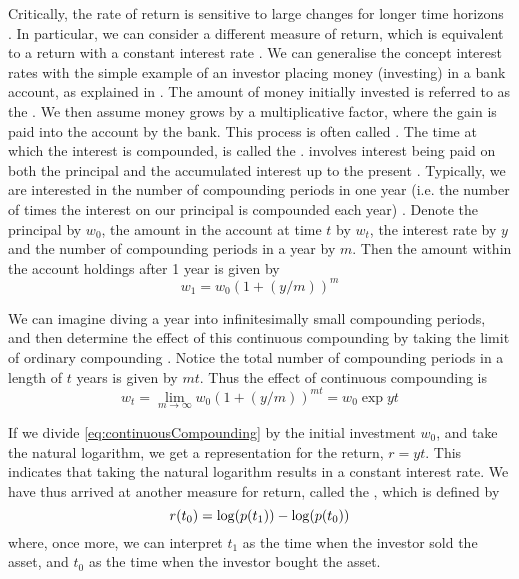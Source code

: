 Critically, the rate of return is sensitive to large changes for longer time horizons \cite{Onn02}. In particular, we can consider a different measure of return, which is equivalent to a return with a constant interest rate \cite{Onn02}. We can generalise the concept interest rates with the simple example of an investor placing money (investing) in a bank account, as explained in \cite{Kuh12c,Lue98}.
The amount of money initially invested is referred to as the . We then assume money grows by a multiplicative factor, where the gain is paid into the account by the bank. This process is often called . The time at which the interest is compounded, is called the .
 involves interest being paid on both the principal and the accumulated interest up to the present \cite{Onn02}. Typically, we are interested in the number of compounding periods in one year (i.e. the number of times the interest on our principal is compounded each year) \cite{Kuh12c}. Denote the principal by $w_{0}$, the amount in the account at time $t$ by $w_{t}$, the interest rate by $y$ and the number of compounding periods in a year by $m$. Then the amount within the account holdings after 1 year is given by
\begin{equation}
	\label{eq:compoundInterest}
	w_{1} = w_{0} (1 + (y/m))^{m}
\end{equation}

We can imagine diving a year into infinitesimally small compounding periods, and then determine the effect of this continuous compounding by taking the limit of ordinary compounding \cite{Lue98}. Notice the total number of compounding periods in a length of $t$ years is given by $mt$. Thus the effect of continuous compounding is
\begin{equation}
	\label{eq:continuousCompounding}
	w_{t} = \lim_{m {\to} \infty} w_{0}(1 + (y/m))^{mt} = w_{0}\exp{yt}
\end{equation}

If we divide \cref{eq:continuousCompounding} by the initial investment $w_{0}$, and take the natural logarithm, we get a representation for the return, $r = yt$. This indicates that taking the natural logarithm results in a constant interest rate.
We have thus arrived at another measure for return, called the , which is defined by
\begin{equation}
	\label{eq:logarithmicReturn}
	r(t_{0}) = \log(p(t_{1})) - \log(p(t_{0}))
\end{equation}
where, once more, we can interpret $t_{1}$ as the time when the investor sold the asset, and $t_{0}$ as the time when the investor bought the asset.

